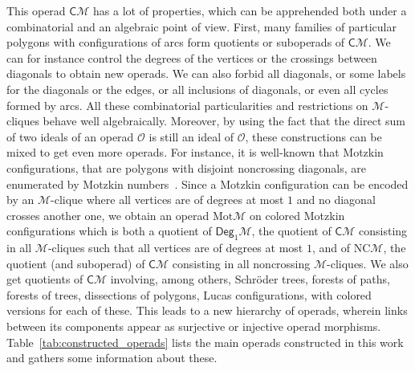\documentclass[10pt,reqno]{amsart}
\numberwithin{equation}{subsection}
\newcommand{\Oca}{\mathcal{O}}
\newcommand{\Mca}{\mathcal{M}}
\newcommand{\Cli}{\mathsf{C}}
\newcommand{\Deg}{\mathsf{Deg}}
\newcommand{\NC}{\mathrm{NC}}
\newcommand{\Motzkin}{\mathrm{Mot}}
\begin{document}
This operad $\Cli\Mca$ has a lot of properties, which can be apprehended
both under a combinatorial and an algebraic point of view. First, many
families of particular polygons with configurations of arcs form
quotients or suboperads of $\Cli\Mca$. We can for instance control the
degrees of the vertices or the crossings between diagonals to obtain new
operads. We can also forbid all diagonals, or some labels for the
diagonals or the edges, or all inclusions of diagonals, or even all
cycles formed by arcs. All these combinatorial particularities and
restrictions on $\Mca$-cliques behave well algebraically. Moreover, by
using the fact that the direct sum of two ideals of an operad $\Oca$ is
still an ideal of $\Oca$, these constructions can be mixed to get even
more operads. For instance, it is well-known that Motzkin configurations,
that are polygons with disjoint noncrossing diagonals, are enumerated by
Motzkin numbers~\cite{Mot48}. Since a Motzkin configuration can be
encoded by an $\Mca$-clique where all vertices are of degrees at most
$1$ and no diagonal crosses another one, we obtain an operad
$\Motzkin\Mca$ on colored Motzkin configurations which is both a
quotient of $\Deg_1\Mca$, the quotient of $\Cli\Mca$ consisting in all
$\Mca$-cliques such that all vertices are of degrees at most $1$, and of
$\NC\Mca$, the quotient (and suboperad) of $\Cli\Mca$ consisting in all
noncrossing $\Mca$-cliques. We also get quotients of $\Cli\Mca$
involving, among others, Schröder trees, forests of paths, forests of
trees, dissections of polygons, Lucas configurations, with colored
versions for each of these. This leads to a new hierarchy of operads,
wherein links between its components appear as surjective or injective
operad morphisms. Table~\ref{tab:constructed_operads} lists the main
operads constructed in this work and gathers some information about
these.
\end{document}
